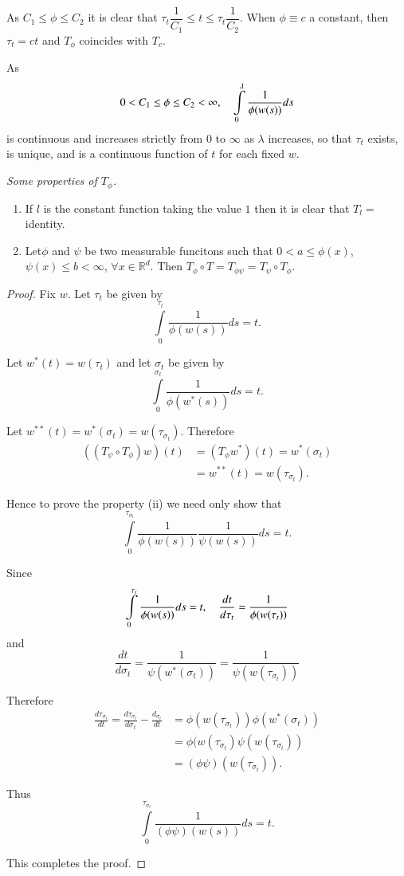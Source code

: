 As $C_{1}\leq \phi\leq C_{2}$ it is clear that
$\tau_{t}\dfrac{1}{C_{1}}\leq t\leq \tau_{t}\dfrac{1}{C_{2}}$. When
$\phi\equiv c$ a constant, then $\tau_{t}=ct$ and $T_{\phi}$ coincides
with $T_{c}$. 

As
$$
0<C_{1}\leq \phi\leq C_{2}<\infty,\quad
\int\limits^{\lambda}_{0}\frac{1}{\phi(w(s))}ds 
$$
is continuous and increases strictly from $0$ to $\infty$ as $\lambda$
increases, so that $\tau_{t}$ exists, is unique, and is a continuous
function of $t$ for each fixed $w$.

\medskip
\noindent
{\em Some properties of $T_{\phi}$.}
\begin{enumerate}
\renewcommand{\theenumi}{\roman{enumi}}
\renewcommand{\labelenumi}{(\theenumi)}
\item If $l$ is the constant function taking the value $1$ then it is
  clear that $T_{l}=$ identity.

\item Let\pageoriginale $\phi$ and $\psi$ be two measurable funcitons
  such that $0<a\leq \phi(x)$, $\psi(x)\leq b<\infty$, $\forall x\in
  \mathbb{R}^{d}$. Then $T_{\phi}\circ T=T_{\phi\psi}=T_{\psi}\circ T_{\phi}$.
\end{enumerate}

\begin{proof}
Fix $w$. Let $\tau_{t}$ be given by
$$
\int\limits^{\tau_{t}}_{0}\frac{1}{\phi(w(s))}ds=t.
$$

Let $w^{*}(t)=w(\tau_{t})$ and let $\sigma_{t}$ be given by
$$
\int\limits^{\sigma_{t}}_{0}\frac{1}{\phi(w^{*}(s))}ds=t.
$$

Let $w^{**}(t)=w^{*}(\sigma_{t})=w(\tau_{\sigma_{t}})$. Therefore
\begin{align*}
((T_{\psi}\circ T_{\phi})w)(t) &= (T_{\phi}w^{*})(t)=w^{*}(\sigma_{t})\\
&= w^{**}(t)=w(\tau_{\sigma_{t}}).
\end{align*}

Hence to prove the property (ii) we need only show that
$$
\int\limits^{\tau_{\sigma_{t}}}_{0}\frac{1}{\phi(w(s))}\frac{1}{\psi(w(s))}ds=t. 
$$

Since
$$
\int\limits^{\tau_{t}}_{0}\frac{1}{\phi(w(s))}ds=t,\quad
\frac{dt}{d\tau_{t}}=\frac{1}{\phi(w(\tau_{t}))} 
$$
and
$$
\frac{dt}{d\sigma_{t}}=\frac{1}{\psi(w^{*}(\sigma_{t}))}=\frac{1}{\psi(w(\tau_{\sigma_{t}}))} 
$$

Therefore
\begin{align*}
\frac{d\tau_{\sigma_{t}}}{dt}=\frac{d\tau_{\sigma_{t}}}{d\sigma_{t}}-\frac{d_{\sigma_{t}}}{dt}
&=\phi(w(\tau_{\sigma_{t}}))\phi(w^{*}(\sigma_{t}))\\
&=\phi(w(\tau_{\sigma_{t}})\psi(w(\tau_{\sigma_{t}}))\\
&=(\phi\psi)(w(\tau_{\sigma_{t}})).
\end{align*}\pageoriginale

Thus
$$
\int\limits^{\tau_{\sigma_{t}}}_{0}\frac{1}{(\phi\psi)(w(s))}ds=t.
$$

This completes the proof.
\end{proof}

